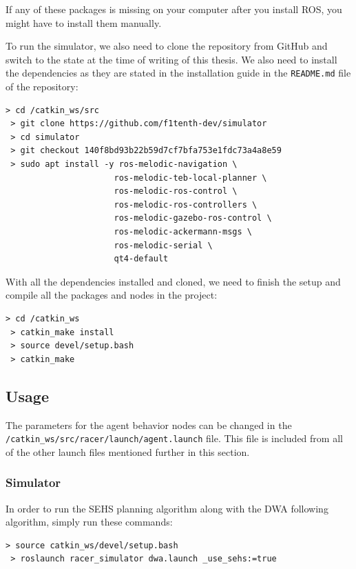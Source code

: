 If any of these packages is missing on your computer after you install ROS, you might have to install them manually.

To run the simulator, we also need to clone the repository from GitHub and switch to the state at the time of writing of this thesis. We also need to install the dependencies as they are stated in the installation guide in the \texttt{README.md} file of the repository:

\begin{Verbatim}[fontsize=\small]
 > cd /catkin_ws/src
 > git clone https://github.com/f1tenth-dev/simulator
 > cd simulator
 > git checkout 140f8bd93b22b59d7cf7bfa753e1fdc73a4a8e59
 > sudo apt install -y ros-melodic-navigation \
                      ros-melodic-teb-local-planner \
                      ros-melodic-ros-control \
                      ros-melodic-ros-controllers \
                      ros-melodic-gazebo-ros-control \
                      ros-melodic-ackermann-msgs \
                      ros-melodic-serial \
                      qt4-default
\end{Verbatim}

With all the dependencies installed and cloned, we need to finish the setup and compile all the packages and nodes in the project:

\begin{Verbatim}[fontsize=\small]
 > cd /catkin_ws
 > catkin_make install
 > source devel/setup.bash
 > catkin_make
\end{Verbatim}

\subsection{Usage}

The parameters for the agent behavior nodes can be changed in the \texttt{/catkin\_ws/src/racer/launch/agent.launch} file. This file is included from all of the other launch files mentioned further in this section.

\subsubsection{Simulator}

In order to run the \gls*{SEHS} planning algorithm along with the \gls*{DWA} following algorithm, simply run these commands:

\begin{Verbatim}[fontsize=\small]
 > source catkin_ws/devel/setup.bash
 > roslaunch racer_simulator dwa.launch _use_sehs:=true
\end{Verbatim}

